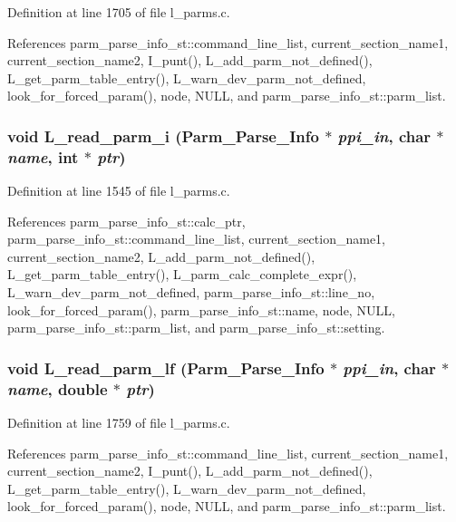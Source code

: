 Definition at line 1705 of file l\_\-parms.c.

References parm\_\-parse\_\-info\_\-st::command\_\-line\_\-list, current\_\-section\_\-name1, current\_\-section\_\-name2, I\_\-punt(), L\_\-add\_\-parm\_\-not\_\-defined(), L\_\-get\_\-parm\_\-table\_\-entry(), L\_\-warn\_\-dev\_\-parm\_\-not\_\-defined, look\_\-for\_\-forced\_\-param(), node, NULL, and parm\_\-parse\_\-info\_\-st::parm\_\-list.
\subsubsection{\setlength{\rightskip}{0pt plus 5cm}void L\_\-read\_\-parm\_\-i (\bf{Parm\_\-Parse\_\-Info} $\ast$ {\em ppi\_\-in}, char $\ast$ {\em name}, int $\ast$ {\em ptr})}\label{l__parms_8c_ff1906fe6912099e08d84bb82778b69c}




Definition at line 1545 of file l\_\-parms.c.

References parm\_\-parse\_\-info\_\-st::calc\_\-ptr, parm\_\-parse\_\-info\_\-st::command\_\-line\_\-list, current\_\-section\_\-name1, current\_\-section\_\-name2, L\_\-add\_\-parm\_\-not\_\-defined(), L\_\-get\_\-parm\_\-table\_\-entry(), L\_\-parm\_\-calc\_\-complete\_\-expr(), L\_\-warn\_\-dev\_\-parm\_\-not\_\-defined, parm\_\-parse\_\-info\_\-st::line\_\-no, look\_\-for\_\-forced\_\-param(), parm\_\-parse\_\-info\_\-st::name, node, NULL, parm\_\-parse\_\-info\_\-st::parm\_\-list, and parm\_\-parse\_\-info\_\-st::setting.
\subsubsection{\setlength{\rightskip}{0pt plus 5cm}void L\_\-read\_\-parm\_\-lf (\bf{Parm\_\-Parse\_\-Info} $\ast$ {\em ppi\_\-in}, char $\ast$ {\em name}, double $\ast$ {\em ptr})}\label{l__parms_8c_a4e8c282fc28f81f6ece6a572d0b9b12}




Definition at line 1759 of file l\_\-parms.c.

References parm\_\-parse\_\-info\_\-st::command\_\-line\_\-list, current\_\-section\_\-name1, current\_\-section\_\-name2, I\_\-punt(), L\_\-add\_\-parm\_\-not\_\-defined(), L\_\-get\_\-parm\_\-table\_\-entry(), L\_\-warn\_\-dev\_\-parm\_\-not\_\-defined, look\_\-for\_\-forced\_\-param(), node, NULL, and parm\_\-parse\_\-info\_\-st::parm\_\-list.
